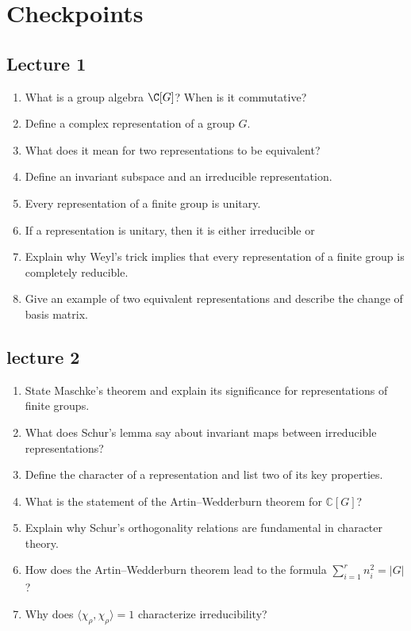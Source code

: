 \section*{Checkpoints}
\subsection*{Lecture 1}

\begin{enumerate}
    \item What is a group algebra $\C[G]$? When is it commutative?
    \item Define a complex representation of a group $G$. 
    \item What does it mean for two representations to be equivalent?
    \item Define an invariant subspace and an irreducible representation.
    \item Every representation of a finite group is unitary.
    \item If a representation is unitary, then it is either irreducible or
    \item Explain why Weyl’s trick implies that every representation of a
            finite group is completely reducible.
    \item Give an example of two equivalent representations and describe
            the change of basis matrix.
\end{enumerate}

\subsection*{lecture 2}
\begin{enumerate}
        \item State Maschke’s theorem and explain its significance for representations of finite groups.
        \item What does Schur’s lemma say about invariant maps between irreducible representations?
        \item Define the character of a representation and list two of its key properties.
        \item What is the statement of the Artin–Wedderburn theorem for $\mathbb{C}[G]$?
        \item Explain why Schur’s orthogonality relations are fundamental in character theory.
        \item How does the Artin–Wedderburn theorem lead to the formula $\sum_{i=1}^r n_i^2 = |G|$?
        \item Why does $\langle \chi_\rho, \chi_\rho \rangle = 1$ characterize irreducibility?
\end{enumerate}
